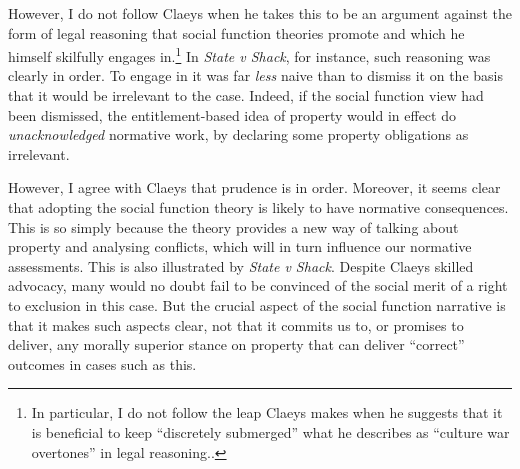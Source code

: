 However, I do not follow Claeys when he takes this to be an argument against the form of legal reasoning that social function theories promote and which he himself skilfully engages in.\footnote{In particular, I do not follow the leap Claeys makes when he suggests that it is beneficial to keep ``discretely submerged'' what he describes as ``culture war overtones'' in legal reasoning.\cite[947]{claeys09}.} In {\it State v Shack}, for instance, such reasoning was clearly in order. To engage in it was far {\it less} naive than to dismiss it on the basis that it would be irrelevant to the case. Indeed, if the social function view had been dismissed, the entitlement-based idea of property would in effect do {\it unacknowledged} normative work, by declaring some property obligations as irrelevant.

However, I agree with Claeys that prudence is in order. Moreover, it seems clear that  adopting the social function theory is likely to have normative consequences. This is so simply because the theory provides a new way of talking about property and analysing conflicts, which will in turn influence our normative assessments. This is also illustrated by {\it State v Shack}. Despite Claeys skilled advocacy, many would no doubt fail to be convinced of the social merit of  a right to exclusion in this case. But the crucial aspect of the social function narrative is that it makes such aspects clear, not that it commits us to, or promises to deliver, any morally superior stance on property that can deliver ``correct'' outcomes in cases such as this.

